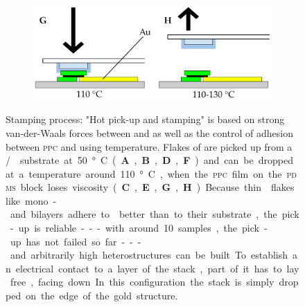 \begin{figure}[t]
\begin{subfigure}{0.49\textwidth}
\end{subfigure}
\begin{subfigure}{0.49\textwidth}
	\includegraphics[width=\textwidth]{stamp_gh}
\end{subfigure}
\caption{Stamping process: "Hot pick-up and stamping" is based on strong van-der-Waals forces between \hbng and \tmds as well as the control of adhesion between \textsc{ppc} and \hbng using temperature. Flakes of \hbng are picked up from a \si/\sio substrate at 50 °C (\textbf{A}, \textbf{B}, \textbf{D}, \textbf{F}) and can be dropped at a temperature around 110 °C, when the \textsc{ppc} film on the \textsc{pdms} block loses viscosity (\textbf{C}, \textbf{E}, \textbf{G}, \textbf{H}). Because thin \tmdg flakes like mono- and bilayers adhere to \hbng better than to their substrate, the pick-up is reliable---with around 10 samples, the pick-up has not failed so far---and arbitrarily high heterostructures can be built. To establish an electrical contact to a layer of the stack, part of it has to lay free, facing down. In this configuration the stack is simply dropped on the edge of the gold structure.}
	\label{stamping}
\end{figure}

